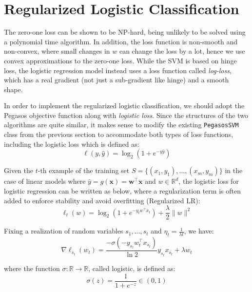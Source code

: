 \section{Regularized Logistic Classification}

The zero-one loss can be shown to be NP-hard, being unlikely to be solved using a polynomial time algorithm. In addition, the loss function is non-smooth and non-convex, where small changes in $w$ can change the loss by a lot, hence we use convex approximations to the zero-one loss. While the SVM is based on hinge loss, the logistic regression model instead uses a loss function called \textit{log-loss}, which has a real gradient (not just a sub-gradient like hinge) and a smooth shape.

In order to implement the regularized logistic classification, we should adopt the Pegasos objective function along with \textit{logistic loss}. Since the structures of the two algorithms are quite similar, it makes sense to modify the existing \texttt{PegasosSVM} class from the previous section to accommodate both types of loss functions, including the logistic loss which is defined as:
\begin{equation}
    \ell(y, \hat{y}) = \log_2(1 + e^{-y\hat{y}})
\end{equation}

Given the $t$-th example of the training set $S = \{(x_1,y_1),\dots,(x_m,y_m)\}$ in the case of linear models where $\hat{y} = g(\boldsymbol{x}) = \boldsymbol{w}^\top \boldsymbol{x}$ and $w \in \mathbb{R}^d$, the logistic loss for logistic regression can be written as below, where a regularization term is often added to enforce stability and avoid overfitting (Regularized LR):
\begin{equation}
    \ell_t (w) = \log_2(1+e^{-y_t w^\top x_t}) + \frac{\lambda}{2} \|w\|^2
\end{equation}

Fixing a realization of random variables $s_1,\dots,s_t$ and $\eta_t = \frac{1}{\lambda t}$, we have:
\begin{equation}
    \nabla \ell_{s_t} (w_t) = \frac{-\sigma\left( -y_{s_t} w_t^\top x_{s_t} \right)}{\ln 2} y_{s_t} x_{s_t} + \lambda w_t
\end{equation}

where the function $\sigma: \mathbb{R} \rightarrow \mathbb{R}$, called logistic, is defined as:
\begin{equation}
    \sigma(z) = \frac{1}{1 + e^{-z}} \in (0,1)
\end{equation}

